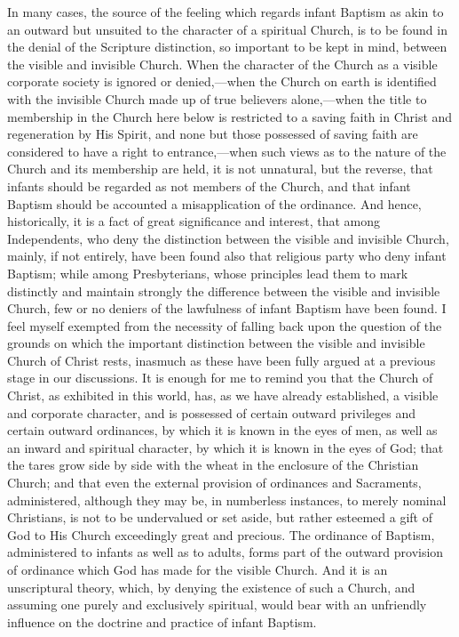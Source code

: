\documentclass[]{book}
\begin{document}
In many cases, the source of the feeling which regards infant Baptism as akin to an outward but unsuited to the character of a spiritual Church, is to be found in the denial of the Scripture distinction, so important to be kept in mind, between the visible and invisible Church. When the character of the Church as a visible corporate society is ignored or denied,---when the Church on earth is identified with the invisible Church made up of true believers alone,---when the title to membership in the Church here below is restricted to a saving faith in Christ and regeneration by His Spirit, and none but those possessed of saving faith are considered to have a right to entrance,---when such views as to the nature of the Church and its membership are held, it is not unnatural, but the reverse, that infants should be regarded as not members of the Church, and that infant Baptism should be accounted a misapplication of the ordinance. And hence, historically, it is a fact of great significance and interest, that among Independents, who deny the distinction between the visible and invisible Church, mainly, if not entirely, have been found also that religious party who deny infant Baptism; while among Presbyterians, whose principles lead them to mark distinctly and maintain strongly the difference between the visible and invisible Church, few or no deniers of the lawfulness of infant Baptism have been found. I feel myself exempted from the necessity of falling back upon the question of the grounds on which the important distinction between the visible and invisible Church of Christ rests, inasmuch as these have been fully argued at a previous stage in our discussions. It is enough for me to remind you that the Church of Christ, as exhibited in this world, has, as we have already established, a visible and corporate character, and is possessed of certain outward privileges and certain outward ordinances, by which it is known in the eyes of men, as well as an inward and spiritual character, by which it is known in the eyes of God; that the tares grow side by side with the wheat in the enclosure of the Christian Church; and that even the external provision of ordinances and Sacraments, administered, although they may be, in numberless instances, to merely nominal Christians, is not to be undervalued or set aside, but rather esteemed a gift of God to His Church exceedingly great and precious. The ordinance of Baptism, administered to infants as well as to adults, forms part of the outward provision of ordinance which God has made for the visible Church. And it is an unscriptural theory, which, by denying the existence of such a Church, and assuming one purely and exclusively spiritual, would bear with an unfriendly influence on the doctrine and practice of infant Baptism.
\end{document}
